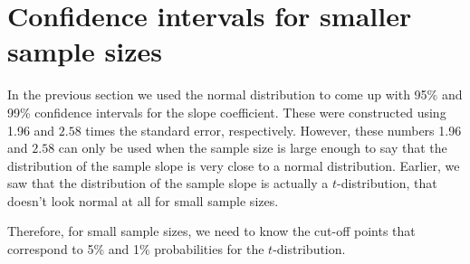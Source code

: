 \documentclass[]{report}\usepackage[]{graphicx}\usepackage[]{color}
\begin{document}
\section{Confidence intervals for smaller sample sizes}

In the previous section we used the normal distribution to come up with 95\% and 99\% confidence intervals for the slope coefficient. These were constructed using 1.96 and $2.58$ times the standard error, respectively. However, these numbers 1.96 and $2.58$ can only be used when the sample size is large enough to say that the distribution of the sample slope is very close to a normal distribution. Earlier, we saw that the distribution of the sample slope is actually a $t$-distribution, that doesn't look normal at all for small sample sizes.

Therefore, for small sample sizes, we need to know the cut-off points that correspond to 5\% and 1\% probabilities for the $t$-distribution.









\end{document}
